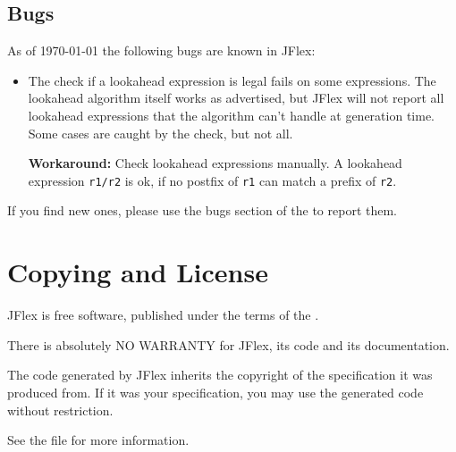 \documentclass[11pt]{scrartcl}
\newcommand{\ver}{1.4\_pre4}
\begin{document}
\subsection{Bugs}

As of {\today} the following bugs are known in JFlex:
\begin{itemize}
\item The check if a lookahead expression is legal fails on some expressions.
  The lookahead algorithm itself works as advertised, but JFlex will not
  report all lookahead expressions that the algorithm can't handle at generation
  time. Some cases are caught by the check, but not all.

  {\bf Workaround:} Check lookahead expressions manually. A lookahead expression 
  \texttt{r1/r2} is ok, if no postfix of \texttt{r1} can match a prefix of \texttt{r2}.
\end{itemize}

If you find new ones, please use the bugs section of the
to report them.
 
 
\section{Copying and License\label{Copyright}}
JFlex is free software, published under the terms of the 
.

There is absolutely NO WARRANTY for JFlex, its code and its documentation.

The code generated by JFlex inherits the copyright of the specification it
was produced from. If it was your specification, you may use the generated 
code without restriction.

See the file  for more information.  
\end{document}
